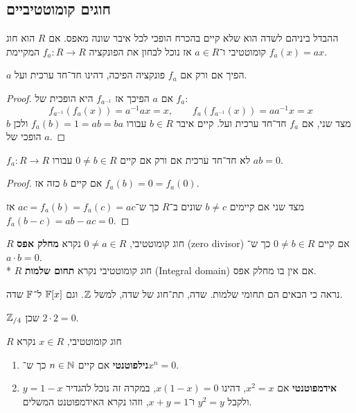 \subsection{חוגים קומוטטיביים}
ההבדל ביניהם לשדה הוא שלא קיים בהכרח הופכי לכל איבר שונה מאפס.
אם $R$ הוא חוג קומוטטיבי ו־$a \in R$ אז נוכל לבחון את הפונקציה $f_a : R \to R$ המקיימת $f_a(x) = ax$.
\begin{lemma}
	$a$ הפיך אם ורק אם $f_a$ פונקציה הפיכה, דהינו חד־חד ערכית ועל.
\end{lemma}
\begin{proof}
	אם $a$ הפיכך אז $f_{a^{-1}}$ היא הופכית של $f_a$:
	\[
		f_{a^{-1}}(f_a(x)) = a^{-1} a x = x,
		\qquad
		f_a(f_{a^{-1}}(x)) = a a^{-1} x = x
	\]
	מצד שני, אם $f_a$ חד־חד ערכית ועל. קיים איבר $b \in R$ עבורו $f_a(b) = 1 = ab = ba$ ולכן $b$ הופכי של $a$.
\end{proof}
\begin{lemma}
	$f_a : R \to R$ לא חד־חד ערכית אם ורק אם קיים $0 \ne b \in R$ עבורו $ab = 0$.
\end{lemma}
\begin{proof}
	אם קיים $b$ כזה אז $f_a(b) = 0 = f_a(0)$.

	מצד שני אם קיימים $b \ne c$ שונים ב־$R$ כך ש־$ac = f_a(b) = f_a(c) = ac$ אז $f_a(b - c) = ab - ac = 0$.
\end{proof}
\begin{definition}
	$R$ חוג קומוטטיבי, $0 \ne a \in R$ נקרא \textbf{מחלק אפס} (zero divisor) אם קיים $0 \ne b \in R$ כך ש־$a \cdot b = 0$. \\*
	$R$ חוג קומוטטיבי נקרא \textbf{תחום שלמות} (Integral domain) אם אין בו מחלק אפס.
\end{definition}
\begin{example}
	נראה כי הבאים הם תחומי שלמות.
	שדה, תת־חוג של שדה, למשל $\mathbb{Z}$. וגם $\mathbb{F}[x]$ ל־$\mathbb{F}$ שדה.
\end{example}
\begin{example}
	$\mathbb{Z}_{/4}$ שכן $2 \cdot 2 = 0$.
\end{example}
\begin{definition}
	$R$ חוג קומוטטיבי, $x \in R$ נקרא
	\begin{enumerate}
		\item \textbf{נילפוטנטי} אם קיים $n \in \mathbb{N}$ כך ש־$x^n = 0$.
		\item \textbf{אידמפוטנטי} אם $x^2 = x$, דהינו $x (1 - x) = 0$, במקרה זה נוכל להגדיר $y = 1 - x$ ולקבל $y^2 = y$ ו־$x + y = 1$, וזהו נקרא האידמפוטנט המשלים.
	\end{enumerate}
\end{definition}

